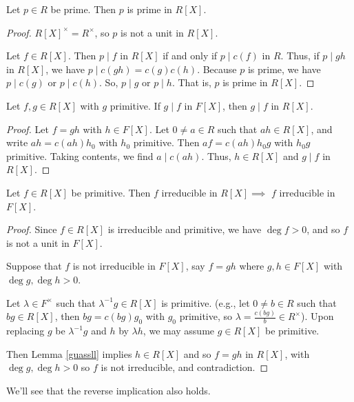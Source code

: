 \begin{corollary}
    \label{primeinpoly}
    Let \(p \in R\) be prime. Then \(p\) is prime in \(R[X]\).
\end{corollary}
\begin{proof}
    \(R[X]^\times = R^\times\), so \(p\) is not a unit in \(R[X]\).

    Let \(f \in R[X]\). Then \(p \mid f\) in \(R[X]\) if and only if \(p \mid c(f)\) in \(R\). Thus, if \(p \mid gh\) in \(R[X]\), we have \(p \mid c(gh) = c(g)c(h)\). Because \(p\) is prime, we have \(p \mid c(g)\) or \(p \mid c(h)\). So, \(p \mid g\) or \(p \mid h\). That is, \(p\) is prime in \(R[X]\).
\end{proof}
\begin{lemma}
    \label{guassll}
    Let \(f, g \in R[X]\) with \(g\) primitive. If \(g \mid f\) in \(F[X]\), then \(g\mid f\) in \(R[X]\).
\end{lemma}
\begin{proof}
    Let \(f = gh\) with \(h \in F[X]\). Let \(0 \neq a \in R\) such that \(ah \in R[X]\), and write \(ah = c(ah)h_0\) with \(h_0\) primitive. Then \(af = c(ah)h_0 g\) with \(h_0 g\) primitive. Taking contents, we find \(a \mid c(ah)\). Thus, \(h \in R[X]\) and \(g \mid f\) in \(R[X]\).
\end{proof}
\begin{lemma}
    \label{Guassle}
    Let \(f \in R[X]\) be primitive. Then \(f\) irreducible in \(R[X]\implies\) \(f\) irreducible in \(F[X]\).
\end{lemma}
\begin{proof}
    Since \(f \in R[X]\) is irreducible and primitive, we have \(\deg f > 0\), and so \(f\) is not a unit in \(F[X]\).

    Suppose that \(f\) is not irreducible in \(F[X]\), say \(f = gh\) where \(g, h \in F[X]\) with \(\deg g, \deg h > 0\).

    Let \(\lambda \in F^\times \) such that \(\lambda^{-1}g \in R[X]\) is primitive. (e.g., let \(0 \neq b \in R\) such that \(bg \in R[X]\), then \(bg = c(bg)g_0\) with \(g_0\) primitive, so \(\lambda=\frac{c(bg)}{b}\in R^\times \)). Upon replacing \(g\) be \(\lambda^{-1}g\) and \(h\) by \(\lambda h\), we may assume \(g \in R[X]\) be primitive.

    Then Lemma \eqref{guassll} implies \(h \in R[X]\) and so \(f = gh\) in \(R[X]\), with \(\deg g, \deg h > 0\) so \(f\) is not irreducible, and contradiction.
\end{proof}
\begin{remark}
    We'll see that the reverse implication also holds.
\end{remark}

